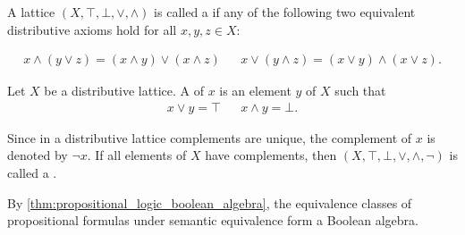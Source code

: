 \begin{definition}\label{def:distributive_lattice}\cite{nLab:distributive_lattice}
  A lattice \( (X, \top, \bot, \lor, \land) \) is called a  if any of the following two equivalent distributive axioms hold for all \( x, y, z \in X \):
  \begin{description}
    \begin{align*}
      x \land (y \lor z) = (x \land y) \lor (x \land z)
      &&
      x \lor (y \land z) = (x \lor y) \land (x \lor z).
    \end{align*}
  \end{description}
\end{definition}

\begin{definition}\label{def:boolean_algebra}\cite{nLab:boolean_algebra}
  Let \( X \) be a distributive lattice. A  of \( x \) is an element \( y \) of \( X \) such that
  \begin{align*}
    x \lor y = \top && x \land y = \bot.
  \end{align*}

  Since in a distributive lattice complements are unique, the complement of \( x \) is denoted by \( \neg x \). If all elements of \( X \) have complements, then \( (X, \top, \bot, \lor, \land, \neg) \) is called a .
\end{definition}

\begin{example}\label{ex:boolean_algebra}
  By \cref{thm:propositional_logic_boolean_algebra}, the equivalence classes of propositional formulas under semantic equivalence form a Boolean algebra.
\end{example}

